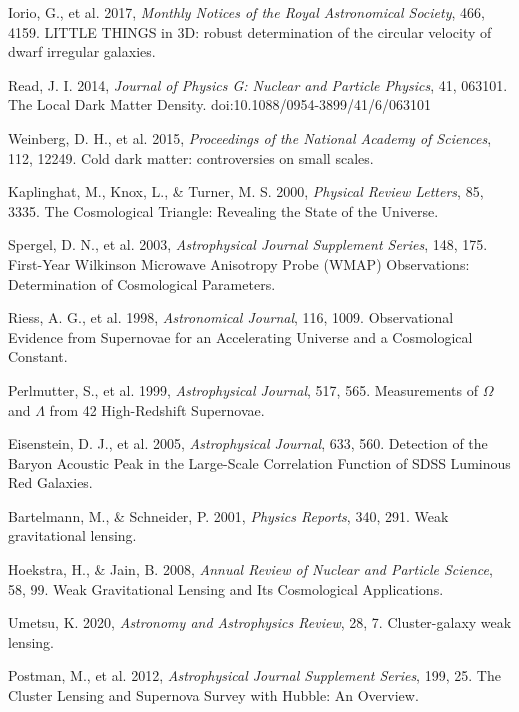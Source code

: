 \documentclass[fleqn,usenatbib]{mnras}
\begin{document}
\begin{thebibliography}{99}
 Iorio, G., et al. 2017, \textit{Monthly Notices of the Royal Astronomical Society}, 466, 4159. LITTLE THINGS in 3D: robust determination of the circular velocity of dwarf irregular galaxies.

 Read, J. I. 2014, \textit{Journal of Physics G: Nuclear and Particle Physics}, 41, 063101. The Local Dark Matter Density. doi:10.1088/0954-3899/41/6/063101

 Weinberg, D. H., et al. 2015, \textit{Proceedings of the National Academy of Sciences}, 112, 12249. Cold dark matter: controversies on small scales.

 Kaplinghat, M., Knox, L., \& Turner, M. S. 2000, \textit{Physical Review Letters}, 85, 3335. The Cosmological Triangle: Revealing the State of the Universe.

 Spergel, D. N., et al. 2003, \textit{Astrophysical Journal Supplement Series}, 148, 175. First-Year Wilkinson Microwave Anisotropy Probe (WMAP) Observations: Determination of Cosmological Parameters.

 Riess, A. G., et al. 1998, \textit{Astronomical Journal}, 116, 1009. Observational Evidence from Supernovae for an Accelerating Universe and a Cosmological Constant.

 Perlmutter, S., et al. 1999, \textit{Astrophysical Journal}, 517, 565. Measurements of $\Omega$ and $\Lambda$ from 42 High-Redshift Supernovae.

 Eisenstein, D. J., et al. 2005, \textit{Astrophysical Journal}, 633, 560. Detection of the Baryon Acoustic Peak in the Large-Scale Correlation Function of SDSS Luminous Red Galaxies.

 Bartelmann, M., \& Schneider, P. 2001, \textit{Physics Reports}, 340, 291. Weak gravitational lensing.

 Hoekstra, H., \& Jain, B. 2008, \textit{Annual Review of Nuclear and Particle Science}, 58, 99. Weak Gravitational Lensing and Its Cosmological Applications.

 Umetsu, K. 2020, \textit{Astronomy and Astrophysics Review}, 28, 7. Cluster-galaxy weak lensing.

 Postman, M., et al. 2012, \textit{Astrophysical Journal Supplement Series}, 199, 25. The Cluster Lensing and Supernova Survey with Hubble: An Overview.


\end{thebibliography}
\end{document}
